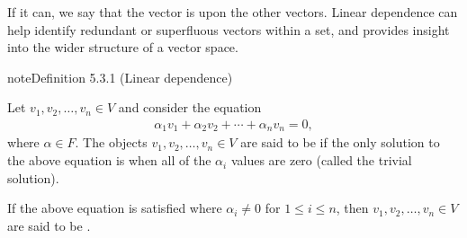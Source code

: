 \documentclass[letterpaper,10pt,english]{jupyterBook}
\begin{document}
\sphinxAtStartPar
If it can, we say that the vector is  upon the other vectors. Linear dependence can help identify redundant or superfluous vectors within a set, and provides insight into the wider structure of a vector space.
\label{_pages/5.3_Linear_dependence:linear-dependence-definition}
\begin{sphinxadmonition}{note}{Definition 5.3.1 (Linear dependence)}



\sphinxAtStartPar
Let \(v_1, v_2, \ldots, v_n \in V\) and consider the equation
\begin{equation}\label{equation:_pages/5.3_Linear_dependence:linear-dependence-equation}
\begin{split} \alpha_1 v_1 + \alpha_2 v_2 + \cdots + \alpha_n v_n = 0, \end{split}
\end{equation}
\sphinxAtStartPar
where \(\alpha \in F\). The objects \(v_1, v_2, \ldots, v_n \in V\) are said to be  if the only solution to the above equation is when all of the \(\alpha_i\) values are zero (called the trivial solution).

\sphinxAtStartPar
If the above equation is satisfied where \(\alpha_i \neq 0\) for \(1 \leq i \leq n\), then \(v_1, v_2, \ldots, v_n \in V\) are said to be .
\end{sphinxadmonition}
\end{document}
